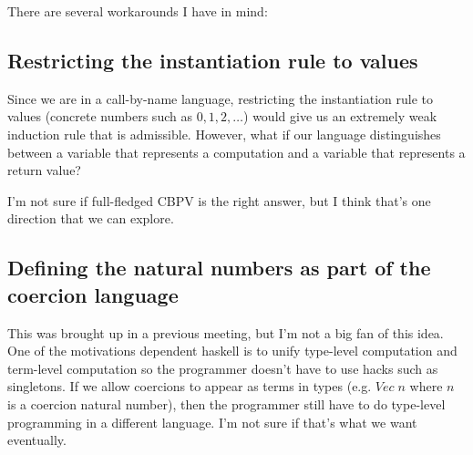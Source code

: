 \documentclass{article}
\begin{document}
There are several workarounds I have in mind:
\subsection{Restricting the instantiation rule to values}
Since we are in a call-by-name language, restricting the instantiation
rule to values (concrete numbers such as $0,1,2,\ldots$) would give us
an extremely weak induction rule that is admissible. However, what if
our language distinguishes between a variable that represents a
computation and a variable that represents a return value?

I'm not sure if full-fledged CBPV is the right answer, but I think
that's one direction that we can explore.

\subsection{Defining the natural numbers as part of the coercion language }
This was brought up in a previous meeting, but I'm not a big fan of
this idea. One of the motivations dependent haskell is to unify type-level
computation and term-level computation so the programmer doesn't have
to use hacks such as singletons. If we allow coercions to appear as
terms in types (e.g. $Vec\;n$ where $n$ is a coercion natural number),
then the programmer still have to do type-level programming in a
different language. I'm not sure if that's what we want eventually.
\end{document}
